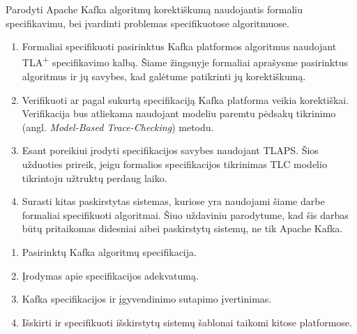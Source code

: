 \documentclass{VUMIFPSmagistrinis}
\begin{document}
		Parodyti Apache Kafka algoritmų korektiškumą naudojantis formaliu specifikavimu, bei įvardinti problemas specifikuotose algoritmuose.


	
		\begin{enumerate}
			\item{Formaliai specifikuoti pasirinktus Kafka platformos algoritmus naudojant TLA\textsuperscript{+} specifikavimo kalbą. Šiame žingsnyje formaliai aprašysme pasirinktus algoritmus ir jų savybes, kad galėtume patikrinti jų korektiškumą.}
			\item{Verifikuoti ar pagal sukurtą specifikaciją Kafka platforma veikia korektiškai. Verifikacija bus atliekama naudojant modeliu paremtu pėdsakų tikrinimo (angl. {\it Model-Based Trace-Checking}) metodu. }
			\item{Esant poreikiui įrodyti specifikacijos savybes naudojant TLAPS. Šios užduoties prireik, jeigu formalios specifikacijos tikrinimas TLC modelio tikrintoju užtruktų perdaug laiko.}
			\item{Surasti kitas paskirstytas sistemas, kuriose yra naudojami šiame darbe formaliai specifikuoti algoritmai. Šiuo uždaviniu parodytume, kad šis darbas būtų pritaikomas didesniai aibei paskirstytų sistemų, ne tik Apache Kafka.}
		\end{enumerate}
	
		\begin{enumerate}
			\item{Pasirinktų Kafka algoritmų specifikacija.}
			\item{Įrodymas apie specifikacijos adekvatumą.}
			\item{Kafka
 specifikacijos ir įgyvendinimo sutapimo įvertinimas.}
			\item{Išskirti ir specifikuoti išskirstytų sistemų šablonai taikomi kitose platformose.}
		\end{enumerate}
	\pagebreak
	\printbibliography[heading=bibintoc] 
\end{document}
